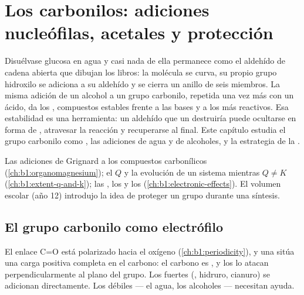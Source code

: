 \chapter{Los carbonilos: adiciones nucleófilas, acetales y protección}\label{ch:b1:acetals-protection}

Disuélvase glucosa en agua y casi nada de ella permanece como el aldehído
de cadena abierta que dibujan los libros: la molécula se curva, su propio
grupo hidroxilo se adiciona a su aldehído y se cierra un anillo de seis
miembros. La misma adición de un alcohol a un grupo carbonilo, repetida
una vez más con un  ácido, da los , compuestos estables
frente a las bases y a los  más reactivos. Esa estabilidad es
una herramienta: un aldehído que un  destruiría puede
ocultarse en forma de , atravesar la reacción y recuperarse al
final. Este capítulo estudia el grupo carbonilo como , las
adiciones de agua y de alcoholes, y la estrategia de la .

\begin{recall}
Las adiciones de Grignard a los compuestos carbonílicos
(\cref{ch:b1:organomagnesium}); el  $Q$ y la
evolución de un sistema mientras $Q \neq K$ (\cref{ch:b1:extent-q-and-k});
las , los  y los 
(\cref{ch:b1:electronic-effects}). El volumen escolar (año 12) introdujo
la idea de proteger un grupo durante una síntesis.
\end{recall}

\section{El grupo carbonilo como electrófilo}

El enlace C=O está polarizado hacia el oxígeno (\cref{ch:b1:periodicity}),
y una   sitúa una carga positiva completa en el
carbono: el carbono es , y los  lo atacan
perpendicularmente al plano del grupo. Los  fuertes (, hidruro, cianuro) se adicionan directamente. Los 
débiles --- el agua, los alcoholes --- necesitan ayuda.

